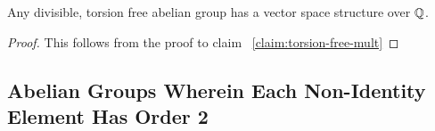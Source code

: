 \begin{corollary}
  Any divisible, torsion free abelian group has a vector space structure over $\mathbb{Q}$.

  \begin{proof}
    This follows from the proof to claim ~\ref{claim:torsion-free-mult}
  \end{proof}
\end{corollary}










\subsection{Abelian Groups Wherein Each Non-Identity Element Has Order 2}
~\label{sec:abelian-groups-order-two}

